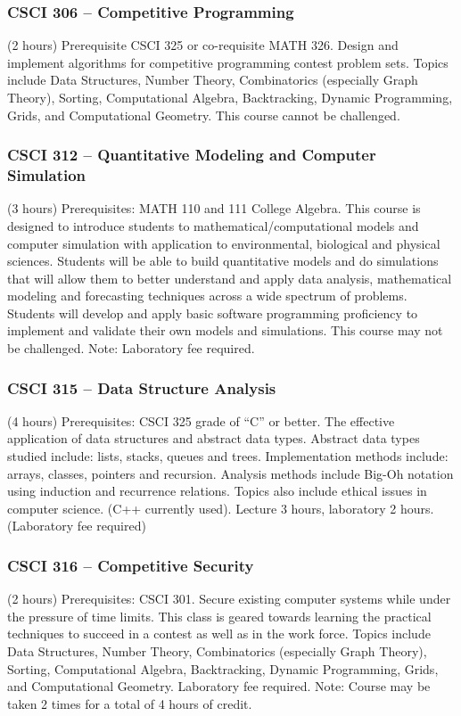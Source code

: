 \subsubsection{CSCI 306 -- Competitive Programming}%
\label{course:CSCI:306}
(2 hours) Prerequisite CSCI 325 or co-requisite MATH 326. Design and implement algorithms for competitive programming contest problem sets.  Topics include Data Structures, Number Theory, Combinatorics (especially Graph Theory), Sorting, Computational Algebra, Backtracking, Dynamic Programming, Grids, and Computational Geometry. This course cannot be challenged.


\subsubsection{CSCI 312 -- Quantitative Modeling and Computer Simulation}%
\label{course:CSCI:312}
(3 hours) Prerequisites: MATH 110 and 111 College Algebra. This course is designed to introduce students to mathematical/computational models and computer simulation with application to environmental, biological and physical sciences.  Students will be able to build quantitative models and do simulations that will allow them to better understand and apply data analysis, mathematical modeling and forecasting techniques across a wide spectrum of problems.  Students will develop and apply basic software programming proficiency to implement and validate their own models and simulations.   This course may not be challenged. Note: Laboratory fee required.

\subsubsection{CSCI 315 -- Data Structure Analysis}%
\label{course:CSCI:315}
(4 hours) Prerequisites: CSCI 325 grade of “C” or better. The effective application of data structures and abstract data types. Abstract data types studied include: lists, stacks, queues and trees. Implementation methods include: arrays, classes, pointers and recursion. Analysis methods include Big-Oh notation using induction and recurrence relations. Topics also include ethical issues in computer science. (C++ currently used). Lecture 3 hours, laboratory 2 hours. (Laboratory fee required)


\subsubsection{CSCI 316 -- Competitive Security}%
\label{course:CSCI:316}
(2 hours) Prerequisites: CSCI 301. Secure existing computer systems while under the pressure of time limits.  This class is geared towards learning the practical techniques to succeed in a contest as well as in the work force.   Topics include Data Structures, Number Theory, Combinatorics (especially Graph Theory), Sorting, Computational Algebra, Backtracking, Dynamic Programming, Grids, and Computational Geometry. Laboratory fee required. Note: Course may be taken 2 times for a total of 4 hours of credit.

